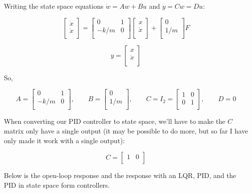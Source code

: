 \documentclass[10pt,letterpaper]{article}
\begin{document}
Writing the state space equations $\dot{w} = Aw + Bu$ and $y = Cw = Du$:

\[
\begin{bmatrix}
	\dot{x} \\
	\ddot{x} \\
\end{bmatrix} =
\begin{bmatrix}
	0 & 1 \\
	-k/m & 0 \\
\end{bmatrix}
\begin{bmatrix}
	x \\
	\dot{x} \\
\end{bmatrix} +
\begin{bmatrix}
	0 \\
	1/m \\
\end{bmatrix} F
\]

\[
y =
\begin{bmatrix}
	x \\
	\dot{x} \\
\end{bmatrix}
\]

So,

\[
A = \begin{bmatrix}
	0 & 1 \\
	-k/m & 0 \\
\end{bmatrix}, \qquad
B = \begin{bmatrix}
	0 \\
	1/m \\
\end{bmatrix}, \qquad
C = I_2 = \begin{bmatrix}
	1 & 0 \\
	0 & 1 \\
\end{bmatrix}, \qquad
D = 0
\]

When converting our PID controller to state space, we'll have to make the $C$ matrix only have a single output (it may be possible to do more, but so far I have only made it work with a single output):

\[
C = \begin{bmatrix}
	1 & 0 \\
\end{bmatrix}
\]

Below is the open-loop response and the response with an LQR, PID, and the PID in state space form controllers.
\end{document}

